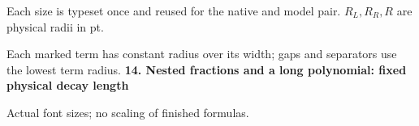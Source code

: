 \documentclass{article}
\newcommand\Mark[1]{\directlua{grid.mark(#1)}}
\begin{document}
\par\medskip
Each size is typeset once and reused for the native and model pair. $R_L,R_R,R$ are physical radii in pt.\par
Each marked term has constant radius over its width; gaps and separators use the lowest term radius.
\newpage
{\Large\bfseries 14. Nested fractions and a long polynomial: fixed physical decay length}\par\medskip
{} Actual font sizes; no scaling of finished formulas.\par\medskip
\end{document}
